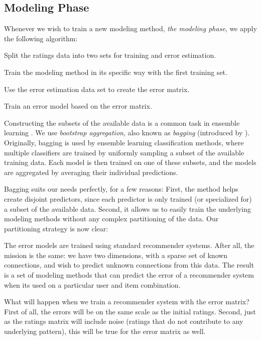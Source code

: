 \subsection{Modeling Phase}

Whenever we wish to train a new modeling method,
\emph{the modeling phase}, we apply the following algorithm:

\begin{enumerate*}
  \item Split the ratings data into two sets for training and error estimation.
  \item Train the modeling method in its specific way with the first training set.
  \item Use the error estimation data set to create the error matrix.
  \item Train an error model based on the error matrix.
\end{enumerate*}

Constructing the subsets of the available data is a common task in ensemble learning
\cite[p7]{Polikar2006}.
We use \emph{bootstrap aggregation}, also known as \emph{bagging} (introduced by \cite{Breiman1996}).
Originally, bagging is used by ensemble learning classification methods, where multiple classifiers are 
trained by uniformly sampling a subset of the available training data. 
Each model is then trained on one of these subsets, and the models are aggregated by averaging their individual predictions.

Bagging suits our needs perfectly, for a few reasons: First, the method helps create disjoint predictors, 
since each predictor is only trained (or specialized for) a subset of the available data.
Second, it allows us to easily train the underlying modeling methods without any complex partitioning of the data.
Our partitioning strategy is now clear:

The error models are trained using standard recommender systems.
After all, the mission is the same:
we have two dimensions, with a sparse set of known connections,
and wish to predict unknown connections from this data.
The result is a set of modeling methods
that can predict the error of a recommender system
when its used on a particular user and item combination.

What will happen when we train a recommender system with the error matrix?
First of all, the errors will be on the same scale as the initial ratings.
Second, just as the ratings matrix will include noise (ratings that
do not contribute to any underlying pattern), this will be 
true for the error matrix as well.

